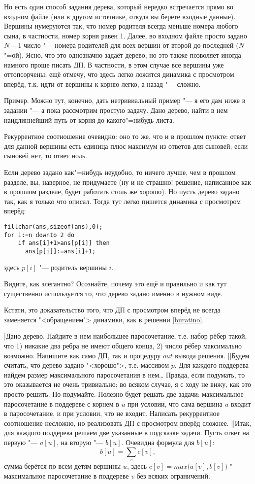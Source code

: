 Но есть один способ задания дерева, который нередко встречается прямо во входном файле (или в другом
источнике, откуда вы берете входные данные). Вершины нумеруются так, что номер родителя всегда
меньше номера любого сына, в частности, номер корня равен 1. Далее, во входном файле просто задано
$N-1$ число "--- номера родителей для всех вершин от второй до последней ($N$"=ой). Ясно, что это
однозначно задаёт дерево, но это также позволяет иногда намного проще писать ДП. В частности, в этом
случае все вершины уже оттопсорчены; ещё отмечу, что здесь легко ложится динамика с просмотром
вперёд, т.к. идти от вершины к корню легко, а назад "--- сложно.

Пример. Можно тут, конечно, дать нетривиальный пример "--- я его дам ниже в задании "--- а пока
рассмотрим простую задачу. Дано дерево, найти в нем наидлиннейший путь от корня до какого"=нибудь
листа.

Рекуррентное соотношение очевидно: оно то же, что и в прошлом пункте: ответ для данной вершины есть
единица плюс максимум из ответов для сыновей; если сыновей нет, то ответ ноль.

Если дерево задано как"=нибудь неудобно, то ничего лучше, чем в прошлом разделе, вы, наверное, не
придумаете (ну и не страшно! решение, написанное как в прошлом разделе, будет работать столь же
хорошо). Но пусть дерево задано так, как я только что описал. Тогда тут легко пишется динамика с
просмотром вперёд:
\begin{codesampleo}\begin{verbatim}
fillchar(ans,sizeof(ans),0);
for i:=n downto 2 do
    if ans[i]+1>ans[p[i]] then
      ans[p[i]]:=ans[i]+1;
\end{verbatim}\end{codesampleo}
здесь $p[i]$ "--- родитель вершины $i$.

Видите, как элегантно? Осознайте, почему это ещё и правильно и как тут существенно используется то,
что дерево задано именно в нужном виде.

Кстати, это доказательство того, что ДП с просмотром вперёд не всегда заменяется "<обращением"> 
динамики, как в решении \ref{buratino}.

\task|Дано дерево. Найдите в нем наибольшее паросочетание, т.е. набор рёбер такой, что 1) никакие
два ребра не имеют общего конца, 2) число рёбер максимально возможно. Напишите как само ДП, так и 
процедуру $out$ вывода решения.
||Будем считать, что дерево задано "<хорошо">, т.е. массивом $p$. Для каждого 
поддерева найдём размер максимального паросочетания в нем\dots{} Правда, если подумать, то это 
оказывается не очень тривиально; во всяком случае, я с ходу не вижу, как это просто решить. Но 
подумайте. Полезно будет решать две задачи: максимальное паросочетание в поддереве с корнем в $u$ 
при условии, что сама вершина $u$ входит в паросочетание, и при условии, что не входит. Написать 
рекуррентное соотношение несложно, но реализовать ДП с просмотром вперёд сложнее.
||Итак, для каждого поддерева решаем две указанные в подсказке задачи. Пусть ответ на первую "--- 
$a[u]$, на вторую "--- $b[u]$. Очевидна формула для $b[u]$:
$$
b[u]=\sum_v c[v],
$$
сумма берётся по всем детям вершины $u$, здесь 
$c[v]=max\big(a[v],b[v]\big)$ "--- максимальное паросочетание в поддереве $v$ без всяких ограничений. 


